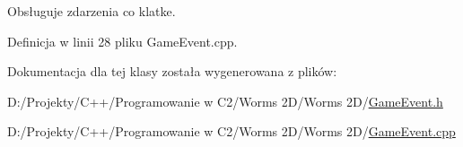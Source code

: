 Obsługuje zdarzenia co klatke. 



Definicja w linii 28 pliku Game\+Event.\+cpp.



Dokumentacja dla tej klasy została wygenerowana z plików\+:\begin{DoxyCompactItemize}
\item 
D\+:/\+Projekty/\+C++/\+Programowanie w C2/\+Worms 2\+D/\+Worms 2\+D/\mbox{\hyperlink{_game_event_8h}{Game\+Event.\+h}}\item 
D\+:/\+Projekty/\+C++/\+Programowanie w C2/\+Worms 2\+D/\+Worms 2\+D/\mbox{\hyperlink{_game_event_8cpp}{Game\+Event.\+cpp}}\end{DoxyCompactItemize}

